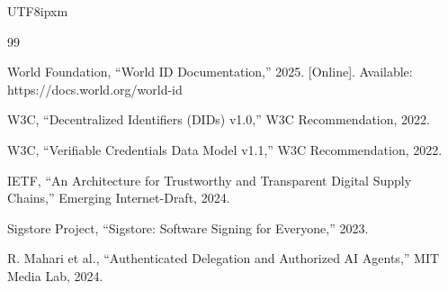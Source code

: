 \documentclass[a4paper,10pt]{article}
\begin{document}
\begin{CJK}{UTF8}{ipxm}
\begin{thebibliography}{99}

World Foundation, ``World ID Documentation,'' 2025. [Online]. Available: https://docs.world.org/world-id

W3C, ``Decentralized Identifiers (DIDs) v1.0,'' W3C Recommendation, 2022.

W3C, ``Verifiable Credentials Data Model v1.1,'' W3C Recommendation, 2022.

IETF, ``An Architecture for Trustworthy and Transparent Digital Supply Chains,'' Emerging Internet-Draft, 2024.

Sigstore Project, ``Sigstore: Software Signing for Everyone,'' 2023.

R. Mahari et al., ``Authenticated Delegation and Authorized AI Agents,'' MIT Media Lab, 2024.

\end{thebibliography}

\end{CJK}
\end{document}
